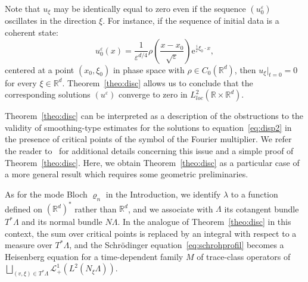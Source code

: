 \documentclass[10pt]{amsart}
\theoremstyle{definition}
\newcommand*\R{{\mathbb R}}
\newcommand*\eps{\varepsilon}
\newcommand*\loc{loc}
\numberwithin{equation}{section}
\newcommand{\ee}{{\mathrm e}}
\begin{document}
Note that $u_\xi$ may be identically equal to zero even if the sequence $(u^\eps_0)$ oscillates in the direction $\xi$. For instance, if the sequence of initial data is a coherent state:
\[
u^\eps_0(x)=\frac{1}{\eps^{d/4}}\rho\left(\frac{x-x_0}{\sqrt{\eps}}\right){\ee}^{\frac{i}{\eps}\xi_0 \cdot x},
\]
centered at a point $(x_0,\xi_0)$ in phase space with $\rho \in C_0(\R^d)$, then $u_\xi|_{t=0}=0$ for every $\xi\in\R^d$. Theorem~\ref{theo:disc} allows us to conclude that the corresponding solutions $(u^\eps)$ converge to zero in $L^2_{\loc}(\R\times\R^d)$.


Theorem~\ref{theo:disc} can be interpreted as a description of the obstructions to the validity of smoothing-type estimates for the solutions to equation~\eqref{eq:disp2} in the presence of critical points of the symbol of the Fourier multiplier. We refer the reader to~\cite{CFMProc} for additional details concerning this issue and a simple proof of Theorem~\ref{theo:disc}. Here, we obtain Theorem~\ref{theo:disc} as a particular case of a more general result which requires some geometric preliminaries.


As for the mode Bloch $\varrho_n$ in the Introduction, we identify $\lambda$ to a function defined on $(\R^d)^*$ rather than $ \R^d$, and we associate with $\Lambda$ its cotangent bundle $T^*\Lambda$ and its normal bundle $N\Lambda$. In the analogue of Theorem~\ref{theo:disc} in this context, the sum over critical points is replaced by an integral with respect to a measure over $T^*\Lambda$, and the Schr\"odinger equation~\eqref{eq:schrohprofil} becomes a Heisenberg equation for a time-dependent family $M$ of trace-class operators of $\bigsqcup_{(v,\xi)\in T^*\Lambda}{\mathcal L}^1_+\left(L^2(N_\xi\Lambda)\right)$.
\end{document}
